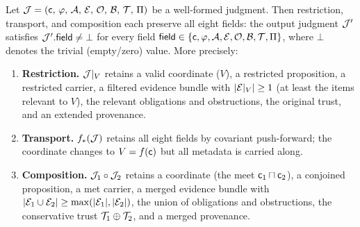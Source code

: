 \documentclass[11pt]{article}
\begin{document}
\begin{theorem}\label{thm:info-pres}
Let $\mathcal{J} = (\mathsf{c},\,\varphi,\,\mathcal{A},\,\mathcal{E},\,\mathcal{O},\,\mathcal{B},\,\mathcal{T},\,\Pi)$
be a well-formed judgment.  Then restriction, transport, and composition
each preserve all eight fields: the output judgment $\mathcal{J}'$ satisfies
$\mathcal{J}'.\mathsf{field} \neq \bot$ for every field $\mathsf{field} \in
\{\mathsf{c}, \varphi, \mathcal{A}, \mathcal{E}, \mathcal{O}, \mathcal{B}, \mathcal{T}, \Pi\}$, where
$\bot$ denotes the trivial (empty/zero) value.  More precisely:
\begin{enumerate}[label=(\alph*)]
  \item \textbf{Restriction.}  $\mathcal{J}|_V$ retains a valid coordinate ($V$),
        a restricted proposition, a restricted carrier, a filtered evidence
        bundle with $|\mathcal{E}|_V| \geq 1$ (at least the items relevant to $V$),
        the relevant obligations and obstructions, the original trust, and
        an extended provenance.
  \item \textbf{Transport.}  $f_*(\mathcal{J})$ retains all eight fields by
        covariant push-forward; the coordinate changes to $V = f(\mathsf{c})$
        but all metadata is carried along.
  \item \textbf{Composition.}  $\mathcal{J}_1 \circ \mathcal{J}_2$ retains a coordinate
        (the meet $\mathsf{c}_1 \sqcap \mathsf{c}_2$), a conjoined proposition,
        a met carrier, a merged evidence bundle with
        $|\mathcal{E}_1 \cup \mathcal{E}_2| \geq \max(|\mathcal{E}_1|, |\mathcal{E}_2|)$,
        the union of obligations and obstructions, the conservative trust
        $\mathcal{T}_1 \oplus \mathcal{T}_2$, and a merged provenance.
\end{enumerate}
\end{theorem}
\end{document}

